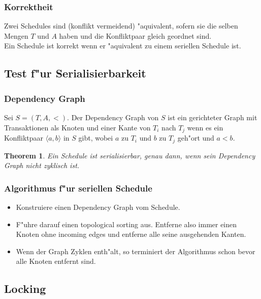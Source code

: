 \documentclass[german, 10pt, a4paper, twocolumn]{scrartcl}
\newtheorem{theorem}{Theorem}
\theoremstyle{definition}
\theoremstyle{remark}
\theoremstyle{example}
\begin{document}
\subsubsection{Korrektheit}

Zwei Schedules sind (konflikt vermeidend) "aquivalent, sofern sie die selben Mengen $T$ und $A$ haben und die Konfliktpaar gleich geordnet sind.\\

Ein Schedule ist korrekt wenn er "aquivalent zu einem seriellen Schedule ist.

\subsection{Test f"ur Serialisierbarkeit}

\subsubsection{Dependency Graph}

Sei $S=(T,A,<)$. Der Dependency Graph von $S$ ist ein gerichteter Graph mit Transaktionen als Knoten und einer Kante von $T_i$ nach $T_j$ wenn es ein Konfliktpaar $\langle a, b \rangle$ in $S$ gibt, wobei $a$ zu $T_i$ und $b$ zu $T_j$ geh"ort und $a<b$.

\begin{theorem}
	Ein Schedule ist serialisierbar, genau dann, wenn sein Dependency Graph nicht zyklisch ist.
\end{theorem}

\subsubsection{Algorithmus f"ur seriellen Schedule}

\begin{itemize}
	\item Konstruiere einen Dependency Graph vom Schedule.
	\item F"uhre darauf einen topological sorting aus. Entferne also immer einen Knoten ohne incoming edges und entferne alle seine ausgehenden Kanten.
	\item Wenn der Graph Zyklen enth"alt, so terminiert der Algorithmus schon bevor alle Knoten entfernt sind.
\end{itemize}

\subsection{Locking}
\end{document}
